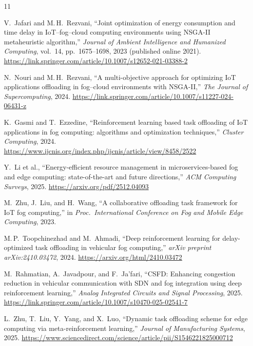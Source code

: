 \documentclass[12pt,a4paper]{article}
\begin{document}
\begin{thebibliography}{11}

V.~Jafari and M.\,H.~Rezvani,
``Joint optimization of energy consumption and time delay in {IoT}--fog--cloud
  computing environments using {NSGA-II} metaheuristic algorithm,''
\textit{Journal of Ambient Intelligence and Humanized Computing},
vol.~14, pp.~1675--1698, 2023 (published online 2021).
\newblock \url{https://link.springer.com/article/10.1007/s12652-021-03388-2}

N.~Nouri and M.\,H.~Rezvani,
``A multi-objective approach for optimizing {IoT} applications offloading in
  fog--cloud environments with {NSGA-II},''
\textit{The Journal of Supercomputing}, 2024.
\newblock \url{https://link.springer.com/article/10.1007/s11227-024-06431-z}

K.~Gasmi and T.~Ezzedine,
``Reinforcement learning based task offloading of {IoT} applications in fog
  computing: algorithms and optimization techniques,''
\textit{Cluster Computing}, 2024.
\newblock \url{https://www.ijcnis.org/index.php/ijcnis/article/view/8458/2522}

Y.~Li et al.,
``Energy-efficient resource management in microservices-based fog and edge
  computing: state-of-the-art and future directions,''
\textit{ACM Computing Surveys}, 2025.
\newblock \url{https://arxiv.org/pdf/2512.04093}

M.~Zhu, J.~Liu, and H.~Wang,
``A collaborative offloading task framework for {IoT} fog computing,''
in \textit{Proc.\ International Conference on Fog and Mobile Edge Computing},
2023.

M.\,P.~Toopchinezhad and M.~Ahmadi,
``Deep reinforcement learning for delay-optimized task offloading in vehicular
  fog computing,''
\textit{arXiv preprint arXiv:2410.03472}, 2024.
\newblock \url{https://arxiv.org/html/2410.03472}

M.~Rahmatian, A.~Javadpour, and F.~Ja'fari,
``{CSFD}: Enhancing congestion reduction in vehicular communication with {SDN}
  and fog integration using deep reinforcement learning,''
\textit{Analog Integrated Circuits and Signal Processing}, 2025.
\newblock \url{https://link.springer.com/article/10.1007/s10470-025-02541-7}

L.~Zhu, T.~Liu, Y.~Yang, and X.~Luo,
``Dynamic task offloading scheme for edge computing via meta-reinforcement
  learning,''
\textit{Journal of Manufacturing Systems}, 2025.
\newblock \url{https://www.sciencedirect.com/science/article/pii/S1546221825000712}


\end{thebibliography}
\end{document}
